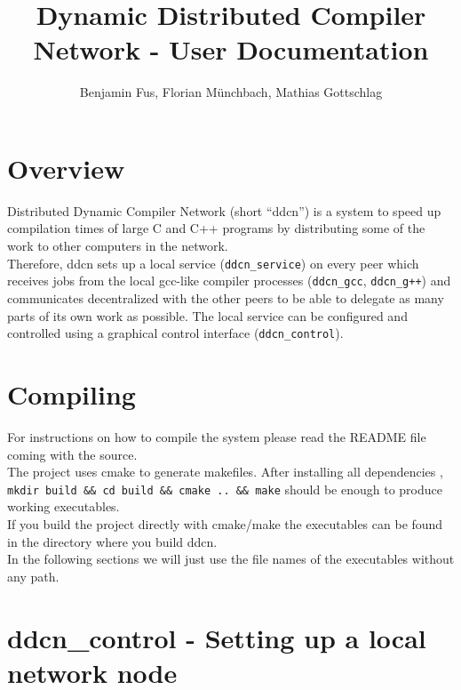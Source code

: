 \documentclass[a4paper,9pt]{scrartcl}
\title{Dynamic Distributed Compiler Network - User Documentation}
\author{Benjamin Fus, Florian Münchbach, Mathias Gottschlag}
\begin{document}
\maketitle

\section{Overview}

Distributed Dynamic Compiler Network (short ``ddcn'') is a system to speed up compilation times of large C and C++ programs by distributing some of the work to other computers in the network.\\Therefore, ddcn sets up a local service (\texttt{ddcn\_service}) on every peer which receives jobs from the local gcc-like compiler processes (\texttt{ddcn\_gcc}, \texttt{ddcn\_g++}) and communicates decentralized with the other peers to be able to delegate as many parts of its own work as possible. The local service can be configured and controlled using a graphical control interface (\texttt{ddcn\_control}).

\section{Compiling}

For instructions on how to compile the system please read the README file coming with the source.\\The project uses cmake to generate makefiles. After installing all dependencies %
, \texttt{mkdir build \&\& cd build \&\& cmake .. \&\& make} should be enough to produce working executables.\\
If you build the project directly with cmake/make the executables can be found in the directory where you build ddcn.\\
In the following sections we will just use the file names of the executables without any path.

\section{ddcn\_control - Setting up a local network node}
\end{document}
